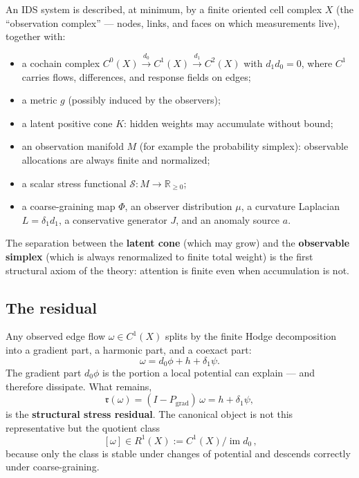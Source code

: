 \documentclass[11pt,a4paper]{article}
\theoremstyle{plain}
\begin{document}
An IDS system is described, at minimum, by a finite oriented cell complex $X$ (the ``observation complex'' --- nodes, links, and faces on which measurements live), together with:
\begin{itemize}[itemsep=1pt,topsep=3pt]
\item a cochain complex $C^0(X)\xrightarrow{\,d_0\,}C^1(X)\xrightarrow{\,d_1\,}C^2(X)$ with $d_1d_0=0$, where $C^1$ carries flows, differences, and response fields on edges;
\item a metric $g$ (possibly induced by the observers);
\item a latent positive cone $K$: hidden weights may accumulate without bound;
\item an observation manifold $M$ (for example the probability simplex): observable allocations are always finite and normalized;
\item a scalar stress functional $\mathcal S:M\to\mathbb R_{\ge0}$;
\item a coarse-graining map $\Phi$, an observer distribution $\mu$, a curvature Laplacian $L=\delta_1 d_1$, a conservative generator $J$, and an anomaly source $a$.
\end{itemize}
The separation between the \textbf{latent cone} (which may grow) and the \textbf{observable simplex} (which is always renormalized to finite total weight) is the first structural axiom of the theory: attention is finite even when accumulation is not.

\subsection{The residual}

Any observed edge flow $\omega\in C^1(X)$ splits by the finite Hodge decomposition into a gradient part, a harmonic part, and a coexact part:
\begin{equation}
\omega=d_0\phi+h+\delta_1\psi.
\end{equation}
The gradient part $d_0\phi$ is the portion a local potential can explain --- and therefore dissipate. What remains,
\begin{equation}
\mathfrak r(\omega)=(I-P_{\mathrm{grad}})\,\omega=h+\delta_1\psi,
\end{equation}
is the \textbf{structural stress residual}. The canonical object is not this representative but the quotient class
\begin{equation}
\boxed{\,[\omega]\in R^1(X):=C^1(X)/\operatorname{im}d_0\,,}
\end{equation}
because only the class is stable under changes of potential and descends correctly under coarse-graining.
\end{document}
